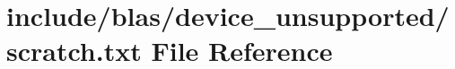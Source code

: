 \hypertarget{device__unsupported_2scratch_8txt}{}\section{include/blas/device\+\_\+unsupported/scratch.txt File Reference}
\label{device__unsupported_2scratch_8txt}
